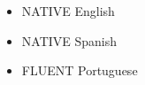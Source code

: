 
  \begin{itemize}
    \setlength\itemsep{-0.3em}
    \item 
    {\scriptsize NATIVE} 
    English 
    \item 
    {\scriptsize NATIVE} 
    Spanish 
    \item 
{\scriptsize FLUENT} 
    Portuguese
  \end{itemize}

% 
% 
%   

